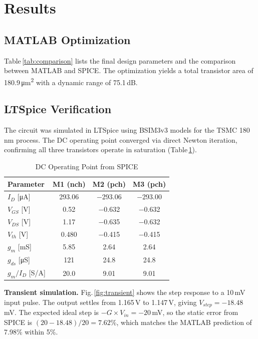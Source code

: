 \documentclass[journal]{IEEEtran}
\begin{document}
\section{Results}

\subsection{MATLAB Optimization}

Table\,\ref{tab:comparison} lists the final design parameters and the comparison between MATLAB and SPICE. The optimization yields a total transistor area of 180.9\,\si{\micro m^2} with a dynamic range of 75.1\,dB.

\subsection{LTSpice Verification}

The circuit was simulated in LTSpice using BSIM3v3 models for the TSMC 180\,nm process. The DC operating point converged via direct Newton iteration, confirming all three transistors operate in saturation (Table\,\ref{tab:op}).

\begin{table}[!t]
\caption{DC Operating Point from SPICE}
\label{tab:op}
\centering
\begin{tabular}{lccc}
\toprule
Parameter & M1 (nch) & M2 (pch) & M3 (pch) \\
\midrule
$I_D$ [\si{\micro A}] & 293.06 & $-$293.06 & $-$293.00 \\
$V_{GS}$ [V] & 0.52 & $-$0.632 & $-$0.632 \\
$V_{DS}$ [V] & 1.17 & $-$0.635 & $-$0.632 \\
$V_{th}$ [V] & 0.480 & $-$0.415 & $-$0.415 \\
$g_m$ [mS] & 5.85 & 2.64 & 2.64 \\
$g_{ds}$ [\si{\micro S}] & 121 & 24.8 & 24.8 \\
$g_m/I_D$ [S/A] & 20.0 & 9.01 & 9.01 \\
\bottomrule
\end{tabular}
\end{table}

\textbf{Transient simulation.}
Fig.\,\ref{fig:transient} shows the step response to a 10\,mV input pulse. The output settles from 1.165\,V to 1.147\,V, giving $V_{step} = -18.48$\,mV. The expected ideal step is $-G \times V_{in} = -20$\,mV, so the static error from SPICE is $(20 - 18.48)/20 = 7.62$\%, which matches the MATLAB prediction of 7.98\% within 5\%.
\end{document}
